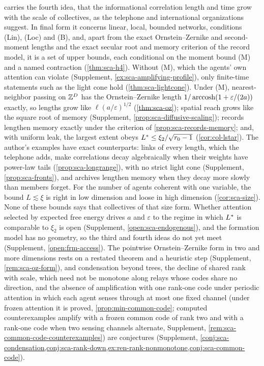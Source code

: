  carries the fourth idea, that the informational correlation length and time grow with the scale of collectives, as the telephone and international organizations suggest. In final form it concerns linear, local, bounded networks, conditions (Lin), (Loc) and (B), and, apart from the exact Ornstein--Zernike and second-moment lengths and the exact secular root and memory criterion of the record model, it is a set of upper bounds, each conditional on the moment bound (M) and a named contraction (\cref{thm:sca-h4}). Without (M), which the agents' own attention can violate (Supplement, \cref{ex:sca-amplifying-profile}), only finite-time statements such as the light cone hold (\cref{thm:sca-lightcone}). Under (M), nearest-neighbor passing on $\mathbb{Z}^D$ has the Ornstein--Zernike length $1/\operatorname{arccosh}(1+\varepsilon/(2a))$ exactly, so lengths grow like $\ell(a/\varepsilon)^{1/2}$ (\cref{thm:sca-oz}); spatial reach grows like the square root of memory (Supplement, \cref{prop:sca-diffusive-scaling}); records lengthen memory exactly under the criterion of \cref{prop:sca-records-memory}; and, with uniform leak, the largest extent obeys $L^{\ast}\le\xi_2/\sqrt{r_0-1}$ (\cref{cor:col-lstar}). The author's examples have exact counterparts: links of every length, which the telephone adds, make correlations decay algebraically when their weights have power-law tails (\cref{prop:sca-longrange}), with no strict light cone (Supplement, \cref{prop:sca-fronts}), and archives lengthen memory when they decay more slowly than members forget. For the number of agents coherent with one variable, the bound $L\lesssim\xi$ is right in low dimension and loose in high dimension (\cref{cor:sca-size}). None of these bounds says that collectives of that size form. Whether attention selected by expected free energy drives $a$ and $\varepsilon$ to the regime in which $L^{\ast}$ is comparable to $\xi_2$ is open (Supplement, \cref{open:sca-endogenous}), and the formation model has no geometry, so the third and fourth ideas do not yet meet (Supplement, \cref{open:frm-access}). The pointwise Ornstein--Zernike form in two and more dimensions rests on a restated theorem and a heuristic step (Supplement, \cref{rem:sca-oz-form}), and condensation beyond trees, the decline of shared rank with scale, which need not be monotone along relays whose codes share no direction, and the absence of amplification with one rank-one code under periodic attention in which each agent senses through at most one fixed channel (under frozen attention it is proved, \cref{prop:min-common-code}; computed counterexamples amplify with a frozen common code of rank two and with a rank-one code when two sensing channels alternate, Supplement, \cref{rem:sca-common-code-counterexamples}) are conjectures (Supplement, \cref{conj:sca-condensation,conj:sca-rank-down,ex:ren-rank-nonmonotone,conj:sca-common-code}).

